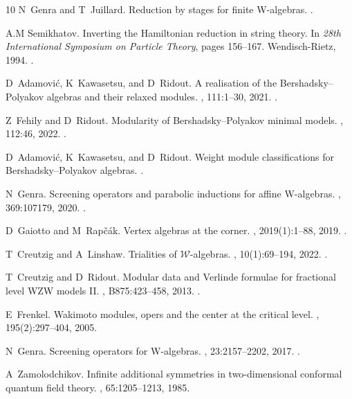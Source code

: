 \documentclass[10pt,a4paper]{amsart}
\numberwithin{equation}{section}
\theoremstyle{plain}
\begin{document}
\begin{thebibliography}{10}
N~Genra and T~Juillard.
\newblock Reduction by stages for finite {W}-algebras.
\newblock {}.

A.M Semikhatov.
\newblock Inverting the {Hamiltonian} reduction in string theory.
\newblock In {\em 28th International Symposium on Particle Theory}, pages
  156--167. Wendisch-Rietz, 1994.
\newblock {}.

D~Adamovi{\'c}, K~Kawasetsu, and D~Ridout.
\newblock A realisation of the {B}ershadsky--{P}olyakov algebras and their
  relaxed modules.
, 111:1--30, 2021.
\newblock {}.

Z~Fehily and D~Ridout.
\newblock Modularity of {B}ershadsky--{P}olyakov minimal models.
, 112:46, 2022.
\newblock {}.

D~Adamovi\'c, K~Kawasetsu, and D~Ridout.
\newblock Weight module classifications for {B}ershadsky--{P}olyakov algebras.
\newblock {}.

N~Genra.
\newblock Screening operators and parabolic inductions for affine {W}-algebras.
, 369:107179, 2020.
\newblock {}.

D~Gaiotto and M~Rap{\v{c}}{\'a}k.
\newblock Vertex algebras at the corner.
, 2019(1):1--88, 2019.
\newblock {}.

T~Creutzig and A~Linshaw.
\newblock Trialities of $\mathcal{W}$-algebras.
, 10(1):69--194, 2022.
\newblock {}.

T~Creutzig and D~Ridout.
\newblock Modular data and {Verlinde} formulae for fractional level {WZW}
  models {II}.
, B875:423--458, 2013.
\newblock {}.

E~Frenkel.
\newblock Wakimoto modules, opers and the center at the critical level.
, 195(2):297--404, 2005.

N~Genra.
\newblock Screening operators for {W}-algebras.
, 23:2157--2202, 2017.
\newblock {}.

A~Zamolodchikov.
\newblock Infinite additional symmetries in two-dimensional conformal quantum
  field theory.
, 65:1205--1213, 1985.


\end{thebibliography}
\end{document}
